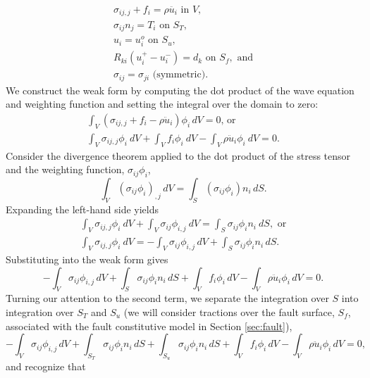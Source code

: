 \begin{gather}
\sigma_{ij,j}+f_{i}=\rho\ddot{u_{i}}\text{ in }V,\\
\sigma_{ij}n_{j}=T_{i}\text{ on }S_{T},\\
u_{i}=u_{i}^{o}\text{ on }S_{u},\\
R_{ki}(u_{i}^{+}-u_{i}^{-})=d_{k}\text{ on }S_{f},\text{ and}\\
\sigma_{ij}=\sigma_{ji}\text{ (symmetric).}
\end{gather}
We construct the weak form by computing the dot product of the wave
equation and weighting function and setting the integral over the
domain to zero:
\begin{gather}
\int_{V}\left(\sigma_{ij,j}+f_{i}-\rho\ddot{u}_{i}\right)\phi_{i}\, dV=0\text{, or }\\
\int_{V}\sigma_{ij,j}\phi_{i}\: dV+\int_{V}f_{i}\phi_{i}\: dV-\int_{V}\rho\ddot{u}_{i}\phi_{i}\: dV=0.
\end{gather}
 Consider the divergence theorem applied to the dot product of the
stress tensor and the weighting function, $\sigma_{ij}\phi_{i}$,
\begin{equation}
\int_{V}(\sigma_{ij}\phi_{i})_{,j}\, dV=\int_{S}(\sigma_{ij}\phi_{i})n_{i}\, dS.
\end{equation}
Expanding the left-hand side yields
\begin{gather}
\int_{V}\sigma_{ij,j}\phi_{i}\: dV+\int_{V}\sigma_{ij}\phi_{i,j}\: dV=\int_{S}\sigma_{ij}\phi_{i}n_{i}\: dS,\text{ or}\\
\int_{V}\sigma_{ij,j}\phi_{i}\: dV=-\int_{V}\sigma_{ij}\phi_{i,j}\, dV+\int_{S}\sigma_{ij}\phi_{i}n_{i}\, dS.
\end{gather}
Substituting into the weak form gives
\begin{equation}
-\int_{V}\sigma_{ij}\phi_{i,j}\, dV+\int_{S}\sigma_{ij}\phi_{i}n_{i}\, dS+\int_{V}f_{i}\phi_{i}\, dV-\int_{V}\rho\ddot{u}_{i}\phi_{i}\, dV=0.
\end{equation}
Turning our attention to the second term, we separate the integration
over $S$ into integration over $S_{T}$ and $S_{u}$ (we will consider
tractions over the fault surface, $S_{f}$, associated with the fault
constitutive model in Section \vref{sec:fault}),
\begin{equation}
-\int_{V}\sigma_{ij}\phi_{i,j}\, dV+\int_{S_{T}}\sigma_{ij}\phi_{i}n_{i}\, dS+\int_{S_{u}}\sigma_{ij}\phi_{i}n_{i}\, dS+\int_{V}f_{i}\phi_{i}\, dV-\int_{V}\rho\ddot{u}_{i}\phi_{i}\, dV=0,
\end{equation}
and recognize that
